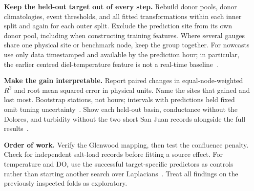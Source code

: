 \documentclass[11pt,letterpaper]{article}
\begin{document}
\textbf{Keep the held-out target out of every step.} Rebuild donor pools, donor climatologies, event thresholds, and all fitted transformations within each inner split and again for each outer split. Exclude the prediction site from its own donor pool, including when constructing training features. Where several gauges share one physical site or benchmark node, keep the group together. For nowcasts use only data timestamped and available by the prediction hour; in particular, the earlier centred diel-temperature feature is not a real-time baseline~\cite{experiments}.

\textbf{Make the gain interpretable.} Report paired changes in equal-node-weighted $R^2$ and root mean squared error in physical units. Name the sites that gained and lost most. Bootstrap stations, not hours; intervals with predictions held fixed omit tuning uncertainty~\cite{followup}. Show each held-out basin, conductance without the Dolores, and turbidity without the two short San Juan records alongside the full results~\cite{main,experiments}.

\textbf{Order of work.} Verify the Glenwood mapping, then test the confluence penalty. Check for independent salt-load records before fitting a source effect. For temperature and DO, use the successful target-specific predictors as controls rather than starting another search over Laplacians~\cite{experiments}. Treat all findings on the previously inspected folds as exploratory.
\end{document}
